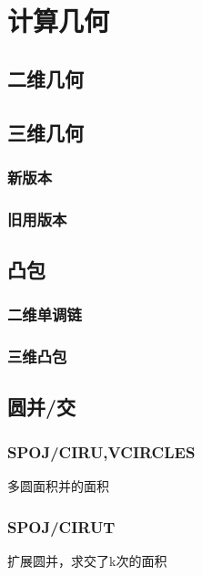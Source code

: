 \section{计算几何}

\subsection{二维几何}

\subsection{三维几何}
\subsubsection{新版本}

\subsubsection{旧用版本}


\subsection{凸包}
\subsubsection{二维单调链}

\subsubsection{三维凸包}


\subsection{圆并/交}
\subsubsection{SPOJ/CIRU,VCIRCLES}
多圆面积并的面积

\subsubsection{SPOJ/CIRUT}
扩展圆并，求交了k次的面积

